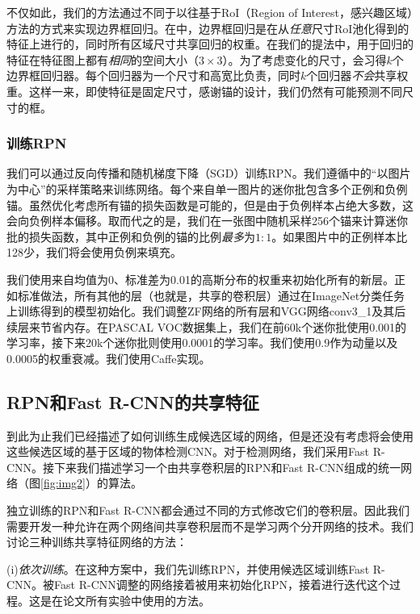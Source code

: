 \documentclass[../main.tex]{subfile}
\begin{document}
不仅如此，我们的方法通过不同于以往基于RoI（Region of Interest，感兴趣区域）方法的方式\cite{spp, fastrcnn}来实现边界框回归。在\cite{spp, fastrcnn}中，边界框回归是在从\textit{任意}尺寸RoI池化得到的特征上进行的，同时所有区域尺寸共享回归的权重。在我们的提法中，用于回归的特征在特征图上都有\textit{相同}的空间大小（$3\times 3$）。为了考虑变化的尺寸，会习得$k$个边界框回归器。每个回归器为一个尺寸和高宽比负责，同时$k$个回归器\textit{不会}共享权重。这样一来，即使特征是固定尺寸，感谢锚的设计，我们仍然有可能预测不同尺寸的框。

\subsubsection{训练RPN} \label{sec:training_RPNs}

我们可以通过反向传播和随机梯度下降（SGD）训练RPN。我们遵循\cite{fastrcnn}中的“以图片为中心”的采样策略来训练网络。每个来自单一图片的迷你批包含多个正例和负例锚。虽然优化考虑所有锚的损失函数是可能的，但是由于负例样本占绝大多数，这会向负例样本偏移。取而代之的是，我们在一张图中随机采样256个锚来计算迷你批的损失函数，其中正例和负例的锚的比例\textit{最多}为$1:1$。如果图片中的正例样本比128少，我们将会使用负例来填充。

我们使用来自均值为0、标准差为0.01的高斯分布的权重来初始化所有的新层。正如标准做法\cite{rcnn}，所有其他的层（也就是，共享的卷积层）通过在ImageNet分类任务上训练得到的模型初始化。我们调整ZF网络的所有层和VGG网络conv3\_1及其后续层来节省内存\cite{fastrcnn}。在PASCAL VOC数据集上，我们在前60k个迷你批使用0.001的学习率，接下来20k个迷你批则使用0.0001的学习率。我们使用0.9作为动量以及0.0005的权重衰减\cite{alexnet}。我们使用Caffe实现。

\subsection{RPN和Fast R-CNN的共享特征} \label{sec:3.2}

到此为止我们已经描述了如何训练生成候选区域的网络，但是还没有考虑将会使用这些候选区域的基于区域的物体检测CNN。对于检测网络，我们采用Fast R-CNN\cite{fastrcnn}。接下来我们描述学习一个由共享卷积层的RPN和Fast R-CNN组成的统一网络（图\ref{fig:img2}）的算法。

独立训练的RPN和Fast R-CNN都会通过不同的方式修改它们的卷积层。因此我们需要开发一种允许在两个网络间共享卷积层而不是学习两个分开网络的技术。我们讨论三种训练共享特征网络的方法：

(i)\textit{依次训练}。在这种方案中，我们先训练RPN，并使用候选区域训练Fast R-CNN。被Fast R-CNN调整的网络接着被用来初始化RPN，接着进行迭代这个过程。这是在论文所有实验中使用的方法。
\end{document}
